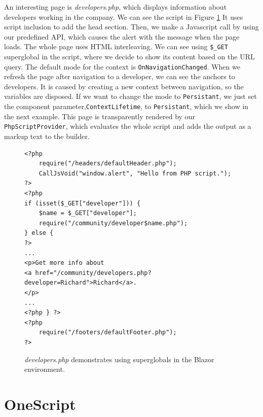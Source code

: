 \par
An interesting page is \textit{developers.php}, which displays information about developers working in the company.
We can see the script in Figure \ref{img25:developer}
It uses script inclusion to add the head section.
Then, we make a Javascript call by using our predefined API, which causes the alert with the message when the page loads.
The whole page uses HTML interleaving.
We can see using \texttt{\$\_GET} superglobal in the script, where we decide to show its content based on the URL query.
The default mode for the context is \texttt{OnNavigationChanged}.
When we refresh the page after navigation to a developer, we can see the anchors to developers.
It is caused by creating a new context between navigation, so the variables are disposed.
If we want to change the mode to \texttt{Persistant}, we just set the component parameter,\texttt{ContextLifetime}, to \texttt{Persistant}, which we show in the next example.
This page is transparently rendered by our \texttt{PhpScriptProvider}, which evaluates the whole script and adds the output as a markup text to the builder.
\par
\begin{figure}
\begin{lstlisting}
<?php
    require("/headers/defaultHeader.php");
    CallJsVoid("window.alert", "Hello from PHP script.");
?>
<?php
if (isset($_GET["developer"])) { 
    $name = $_GET["developer"];
    require("/community/developer$name.php");
} else {
?>
...
<p>Get more info about 
<a href="/community/developers.php?developer=Richard">Richard</a>.
</p>
...
<?php } ?>
<?php
    require("/footers/defaultFooter.php");
?>
\end{lstlisting}
\caption{\textit{developers.php} demonstrates using superglobals in the Blazor environment.}
\label{img25:developer}
\end{figure}

\section{OneScript}

